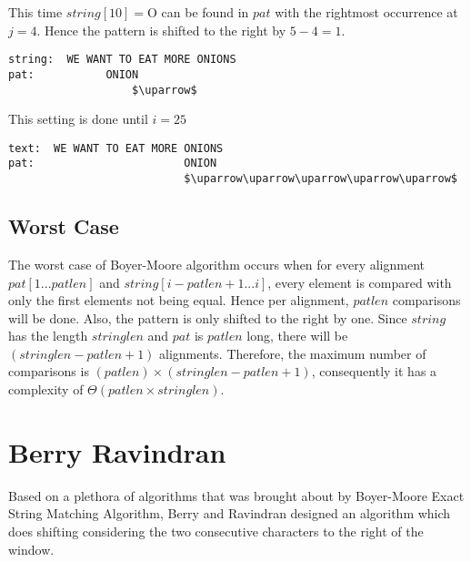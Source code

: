 This time $string[10]=$O can be found in $pat$ with the rightmost occurrence at $j=4$. Hence the pattern is shifted to the right by $5-4=1$.

\begin{lstlisting}[mathescape=true, basicstyle=\LSTfont]
string:  WE WANT TO EAT MORE ONIONS
pat:           ONION
                   $\uparrow$
\end{lstlisting}

This setting is done until $i=25$

\begin{lstlisting}[mathescape=true, basicstyle=\LSTfont]
text:  WE WANT TO EAT MORE ONIONS
pat:                       ONION
                           $\uparrow\uparrow\uparrow\uparrow\uparrow$
\end{lstlisting}

\subsection{Worst Case}
The worst case of Boyer-Moore algorithm occurs when for every alignment $pat[1...patlen]$ and $string[i-patlen+1...i]$, every element is compared with only the first elements not being equal. Hence per alignment, $patlen$ comparisons will be done. Also, the pattern is only shifted to the right by one. Since $string$ has the length $stringlen$ and $pat$ is $patlen$ long, there will be $(stringlen-patlen+1)$ alignments. Therefore, the maximum number of comparisons is $(patlen)\times(stringlen-patlen+1)$, consequently it has a complexity of $\Theta(patlen \times stringlen)$.

\section{Berry Ravindran}		%
Based on a plethora of algorithms that was brought about by Boyer-Moore Exact String Matching Algorithm, Berry and Ravindran designed an algorithm which does shifting considering the two consecutive characters to the right of the window.

